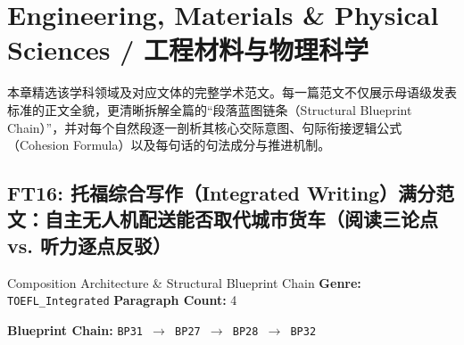\chapter{Engineering, Materials \& Physical Sciences / 工程材料与物理科学}\label{ch:anthology_21}
本章精选该学科领域及对应文体的完整学术范文。每一篇范文不仅展示母语级发表标准的正文全貌，更清晰拆解全篇的“段落蓝图链条（Structural Blueprint Chain）”，并对每个自然段逐一剖析其核心交际意图、句际衔接逻辑公式（Cohesion Formula）以及每句话的句法成分与推进机制。

\section{FT16: 托福综合写作（Integrated Writing）满分范文：自主无人机配送能否取代城市货车（阅读三论点 vs. 听力逐点反驳）}\label{comp:FT16}
\begin{ConceptBox}{Composition Architecture \& Structural Blueprint Chain}
\textbf{Genre:} \texttt{TOEFL\_Integrated} \quad \textbf{Paragraph Count:} 4\par
\textbf{Blueprint Chain:} \texttt{BP31 $\to$ BP27 $\to$ BP28 $\to$ BP32}
\end{ConceptBox}
